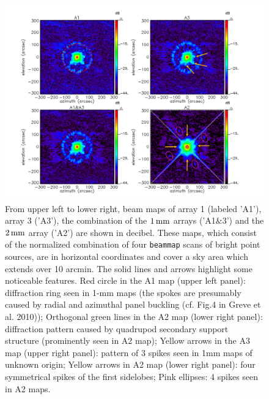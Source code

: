 \begin{figure}[!thbp]
\begin{center}
  \includegraphics[trim=0.5cm 0.5cm 1cm 0cm, clip=true, width=\linewidth]{Figures/Beams_features.pdf}
\caption[Noticeable features of NIKA2 beam pattern.]{From upper left
  to lower right, beam maps of array 1 (labeled 'A1'), array 3 ('A3'),
  the combination of the $1\,\rm{mm}$ arrays ('A1$\&$3') and the
  $2\,\rm{mm}$ array ('A2') are shown in decibel. These maps, which
  consist of the normalized combination of four {\tt beammap} scans of bright
  point sources, are in horizontal coordinates and cover a sky area
  which extends over 10 arcmin. %
  The solid lines and arrows highlight some noticeable features.
  Red circle in the
  A1 map (upper left panel): diffraction ring seen in 1-mm maps
  (the spokes are presumably caused by radial and azimuthal panel buckling (cf. Fig.4 in Greve et
  al. 2010)); Orthogonal green lines in the A2 map (lower right panel): diffraction
  pattern caused by quadrupod secondary support structure (prominently
  seen in A2 map); Yellow arrows in the A3 map (upper right panel):
  pattern of 3 spikes seen in 1mm maps of unknown origin; Yellow
  arrows in A2 map (lower right panel): four symmetrical spikes of the
  first sidelobes; Pink ellipses: 4 spikes seen in A2 maps.}
\label{fig:features}
\end{center}
\end{figure}

